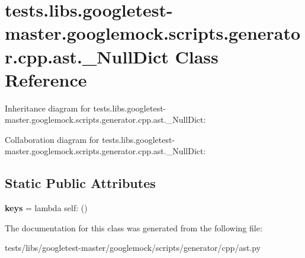 \hypertarget{classtests_1_1libs_1_1googletest-master_1_1googlemock_1_1scripts_1_1generator_1_1cpp_1_1ast_1_1__NullDict}{}\section{tests.\+libs.\+googletest-\/master.googlemock.\+scripts.\+generator.\+cpp.\+ast.\+\_\+\+Null\+Dict Class Reference}
\label{classtests_1_1libs_1_1googletest-master_1_1googlemock_1_1scripts_1_1generator_1_1cpp_1_1ast_1_1__NullDict}


Inheritance diagram for tests.\+libs.\+googletest-\/master.googlemock.\+scripts.\+generator.\+cpp.\+ast.\+\_\+\+Null\+Dict\+:


Collaboration diagram for tests.\+libs.\+googletest-\/master.googlemock.\+scripts.\+generator.\+cpp.\+ast.\+\_\+\+Null\+Dict\+:
\subsection*{Static Public Attributes}
\begin{DoxyCompactItemize}
\item 
\mbox{\label{classtests_1_1libs_1_1googletest-master_1_1googlemock_1_1scripts_1_1generator_1_1cpp_1_1ast_1_1__NullDict_a4a40c8a311583292a1481d4da4cace4d}} 
{\bfseries keys} = lambda self\+: ()
\end{DoxyCompactItemize}


The documentation for this class was generated from the following file\+:\begin{DoxyCompactItemize}
\item 
tests/libs/googletest-\/master/googlemock/scripts/generator/cpp/ast.\+py\end{DoxyCompactItemize}
